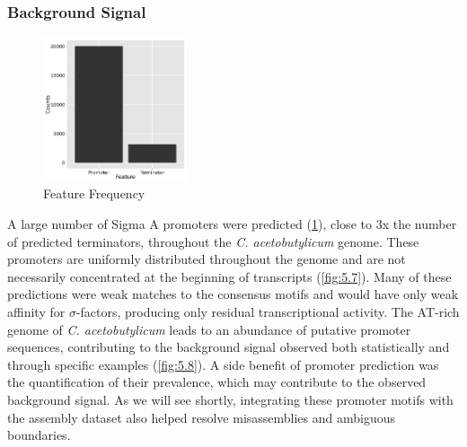 


\subsubsection{Background Signal}
\begin{figure}
\small
\vspace{-20pt}
\begin{center}
\includegraphics[width=0.38\textwidth]{images/Assembly/Background_signal/prediction_frequency.png}
\end{center}
\vspace{-20pt}
\caption{Feature Frequency}\label{fig:5.6}
\end{figure}

A large number of Sigma A promoters were predicted (\ref{fig:5.6}), close to 3x the number of predicted terminators, throughout the \textit{C. acetobutylicum} genome. These promoters are uniformly distributed throughout the genome and are not necessarily concentrated at the beginning of transcripts (\ref{fig:5.7}). Many of these predictions were weak matches to the consensus motifs and would have only weak affinity for $\sigma$-factors, producing only residual transcriptional activity. The AT-rich genome of \textit{C. acetobutylicum} leads to an abundance of putative promoter sequences, contributing to the background signal observed both statistically and through specific examples (\ref{fig:5.8}). A side benefit of promoter prediction was the quantification of their prevalence, which may contribute to the observed background signal. As we will see shortly, integrating these promoter motifs with the assembly dataset also helped resolve misassemblies and ambiguous boundaries. 


